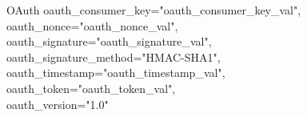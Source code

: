 OAuth oauth\_consumer\_key="oauth\_consumer\_key\_val",\\
oauth\_nonce="oauth\_nonce\_val", \\
oauth\_signature="oauth\_signature\_val", \\
oauth\_signature\_method="HMAC-SHA1", \\
oauth\_timestamp="oauth\_timestamp\_val", \\
oauth\_token="oauth\_token\_val", \\
oauth\_version="1.0" \\
\citep{TwitterAPIAuth}